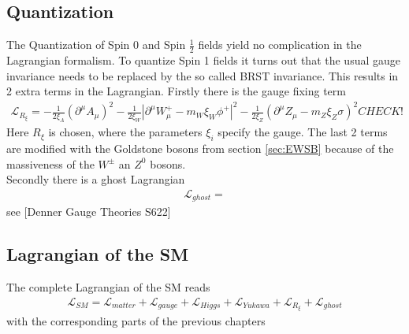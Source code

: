 \subsection{Quantization}
The Quantization of Spin 0 and Spin $\frac{1}{2}$ fields yield no complication in the Lagrangian formalism. To quantize Spin 1 fields it turns out that the usual gauge invariance needs to be replaced by the so called BRST invariance. This results in 2 extra terms in the Lagrangian. Firstly there is the gauge fixing term
\begin{align}
\mathcal{L}_{R_\xi} = -\frac{1}{2\xi_A} (\partial^\mu A_\mu)^2  - \frac{1}{2\xi_W} |\partial^\mu W_\mu^+ - m_W \xi_W \phi^+|^2 - \frac{1}{2\xi_Z} (\partial^\mu Z_\mu - m_Z \xi_Z \sigma)^2 CHECK!
\end{align}
Here $R_\xi$ is chosen, where the parameters $\xi_i$ specify the gauge. The last 2 terms are modified with the Goldstone bosons from section \ref{sec:EWSB} because of the massiveness of the $W^\pm$ an $Z^0$ bosons.\\
Secondly there is a ghost Lagrangian
\begin{align}
\mathcal{L}_{ghost} = 
\end{align}
see [Denner Gauge Theories S622]

\subsection{Lagrangian of the SM}
The complete Lagrangian of the SM reads
\begin{align}
\mathcal{L}_{SM} = \mathcal{L}_{matter} + \mathcal{L}_{gauge} + \mathcal{L}_{Higgs} + \mathcal{L}_{Yukawa} + \mathcal{L}_{R_\xi} + \mathcal{L}_{ghost}
\end{align}
with the corresponding parts of the previous chapters
